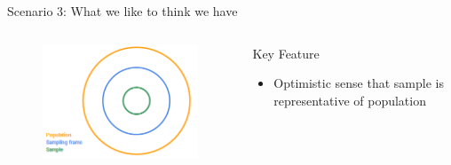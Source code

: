 \documentclass[aspectratio=169]{../latex_main/tntbeamer}  %
\begin{document}
	
	\begin{frame}{Scenario 3: What we like to think we have}
	    \begin{columns}
	        \begin{column}{.4\textwidth}
	           \begin{figure}
	               \includegraphics[scale=.75]{Bild5}
	           \end{figure}
	        \end{column}
	        
	        \begin{column}{.4\textwidth}
	            Key Feature
                \begin{itemize}
                    \item Optimistic sense that sample is representative of population
                \end{itemize}
	        \end{column}
	        
	    \end{columns}
	    
	\end{frame}
	
\end{document}
